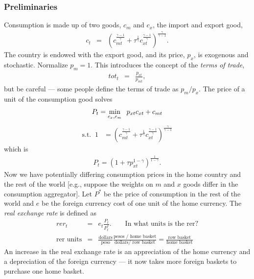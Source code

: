 \documentclass[11pt,pdftex,twoside,letterpaper]{exam}
\begin{document}
\subsubsection{Preliminaries}
Consumption is made up of two goods, $c_m$ and $c_x$, the import and export good,
\begin{eqnarray}
  c_t &=& \left(c_{mt}^\frac{\gamma-1}{\gamma}+\tau^\frac{1}{\gamma}c_{xt}^\frac{\gamma-1}{\gamma}\right)^\frac{\gamma}{\gamma-1}.
\end{eqnarray}
The country is endowed with the export good, and its price, $p_x$, is exogenous and stochastic. Normalize $p_m=1$. This introduces the concept of the \textit{terms of trade},
\begin{eqnarray}
  tot_t &=& \frac{p_{xt}}{p_{mt}},
\end{eqnarray}
but be careful --- some people define the terms of trade as $p_m/p_x$.  The price of a unit of the consumption good solves
\begin{equation}
    P_t = \min_{c_x, c_m} \;\; p_{xt} c_{xt} + c_{mt}\\
\end{equation}
 \begin{eqnarray}
 \textrm{s.t.}\;\; 1& =\left(c_{mt}^\frac{\gamma-1}{\gamma}+\tau^\frac{1}{\gamma}c_{xt}^\frac{\gamma-1}{\gamma}\right)^\frac{\gamma}{\gamma-1}
\end{eqnarray}
which is
\begin{eqnarray}
  P_t = \left(1+\tau p_{xt}^{1-\gamma}\right)^\frac{1}{1-\gamma}.
\end{eqnarray}
Now we have potentially differing consumption prices in the home country and the rest of the world [e.g., suppose the weights on $m$ and $x$ goods differ in the consumption aggregator]. Let $P^*$ be the price of consumption in the rest of the world and $e$ be the foreign currency cost of one unit of the home currency. The \textit{real exchange rate} is defined as
\begin{eqnarray}
  rer_t &=& e_{t}\frac{P_t}{P_t^*}. \qquad \textrm{In what units is the rer?} \\
  \textrm{rer units} & = & \frac{\textrm{dollars}}{\textrm{peso}} \frac{\textrm{pesos / home basket}}{\textrm{dollars/ row basket}}=\frac{\textrm{row basket}}{\textrm{home basket}}
\end{eqnarray}
An increase in the real exchange rate is an appreciation of the home currency and a depreciation of the foreign currency --- it now takes more foreign baskets to purchase one home basket.
\end{document}

